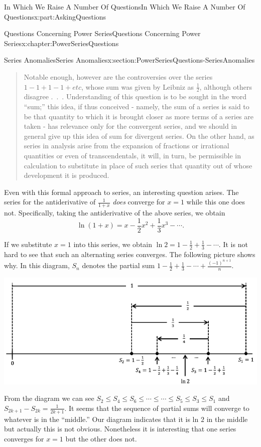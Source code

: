 \documentclass[oneside,10pt,]{book}
\numberwithin{equation}{section}
\begin{document}
\begin{partptx}{In Which We Raise A Number Of Questions}{}{In Which We Raise A Number Of Questions}{}{}{x:part:AskingQuestions}
\begin{chapterptx}{Questions Concerning Power Series}{}{Questions Concerning Power Series}{}{}{x:chapter:PowerSeriesQuestions}
\begin{sectionptx}{Series Anomalies}{}{Series Anomalies}{}{}{x:section:PowerSeriesQuestions-SeriesAnomalies}
\begin{quote}%
Notable enough, however are the controversies over the series \(1-1+1-1+etc\),  whose sum was given by Leibniz as \(\frac{1}{2}\), although others disagree .~.~. Understanding of this question is to be sought in the word ``sum;'' this idea, if thus conceived - namely, the sum of a series is said to be that quantity to which it is brought closer as more terms of a series are taken - has relevance only for the convergent series, and we should in general give up this idea of sum for divergent series. On the other hand, as series in analysis arise from the expansion of fractions or irrational quantities or even of transcendentals, it will, in turn, be permissible in calculation to substitute in place of such series that quantity out of whose development it is produced.%
\end{quote}
Even with this formal approach to series, an interesting question arises. The series for the antiderivative of \(\frac{1}{1+x}\) \emph{does} converge for \(x=1\) while this one does not. Specifically, taking the antiderivative of the above series, we obtain%
\begin{equation*}
\ln(1+x)=x-\frac{1}{2}x^2+\frac{1}{3}x^3-\cdots\text{.}
\end{equation*}
%
\par
If we substitute \(x=1\) into this series, we obtain \(\ln 2=1-\frac{1}{2}+\frac{1}{3}-\cdots\). It is not hard to see that such an alternating series converges. The following picture shows why. In this diagram, \(S_n\) denotes the partial sum \(1-\frac{1}{2}+\frac{1}{3}-\cdots+\frac{(-1)^{n+1}}{n}\).%
\begin{image}{0.05}{0.9}{0.05}%
\includegraphics[width=\linewidth]{images/AltHarmonic.png}
\end{image}%
From the diagram we can see \(S_2\leq S_4\leq S_6\leq\cdots\leq\cdots\leq S_5\leq S_3\leq S_1\) and \(S_{2k+1}-S_{2k}=\frac{1}{2k+1}\). It seems that the sequence of partial sums will converge to whatever is in the ``middle.'' Our diagram indicates that it is ln \(2\) in the middle but actually this is not obvious. Nonetheless it is interesting that one series converges for \(x=1\) but the other does not.%

\end{sectionptx}
\end{chapterptx}
\end{partptx}
\end{document}
